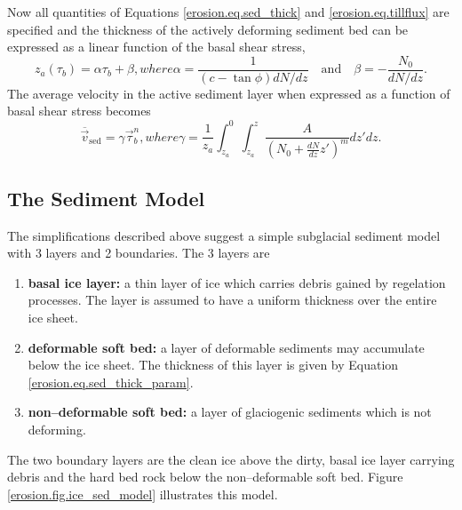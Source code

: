 Now all quantities of Equations \eqref{erosion.eq.sed_thick} and \eqref{erosion.eq.tillflux} are specified and the thickness of the actively deforming sediment bed can be expressed as a linear function of the basal shear stress,
\begin{subequations}
  \begin{equation}
    \label{erosion.eq.sed_thick_param}
    z_a(\tau_b)=\alpha\tau_b+\beta,
  \end{equation}
  where
  \begin{equation}
    \alpha=\frac1{(c-\tan\phi)dN/dz}\quad\text{and}\quad\beta=-\frac{N_0}{dN/dz}.
  \end{equation}
\end{subequations}
The average velocity in the active sediment layer when expressed as a function of basal shear stress becomes
\begin{subequations}
  \begin{equation}
    \label{erosion.eq.sed_trans_param}
    \overline{\vec{v}}_{\text{sed}}=\gamma\vec\tau_b^n,
  \end{equation}
  where
  \begin{equation}
    \gamma=\frac1{z_a}\int_{z_a}^0\int_{z_a}^{z}\frac{A}{\left(N_0+\frac{dN}{dz}z'\right)^m}dz'dz.
  \end{equation}
\end{subequations}

\subsection{The Sediment Model}
The simplifications described above suggest a simple subglacial sediment model with 3 layers and 2 boundaries. The 3 layers are
\begin{enumerate}
\item \textbf{basal ice layer:} a thin layer of ice which carries debris gained
by regelation processes. The layer is assumed to have a uniform thickness over the entire ice sheet.
\item \textbf{deformable soft bed:} a layer of deformable sediments may accumulate below the ice sheet. The thickness of this layer is given by Equation \eqref{erosion.eq.sed_thick_param}.
\item \textbf{non--deformable soft bed:} a layer of glaciogenic sediments which is not deforming.
\end{enumerate}
The two boundary layers are the clean ice above the dirty, basal ice layer carrying debris and the hard bed rock below the non--deformable soft bed. Figure \ref{erosion.fig.ice_sed_model} illustrates this model.

